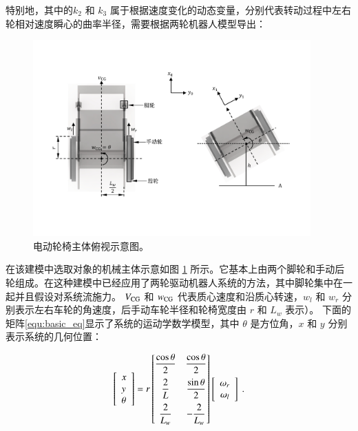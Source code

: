 特别地，其中的$ k_2 $ 和 $ k_3 $ 属于根据速度变化的动态变量，分别代表转动过程中左右轮相对速度瞬心的曲率半径，需要根据两轮机器人模型导出：

\begin{figure}[!b]
	\centering
	\includegraphics[width=0.95\textwidth]{fig/top_view.pdf}
	\caption{电动轮椅主体俯视示意图。}\label{fig:top_view}
\end{figure}

在该建模中选取对象的机械主体示意如图 \ref{fig:top_view} 所示。它基本上由两个脚轮和手动后轮组成。在这种建模中已经应用了两轮驱动机器人系统的方法，其中脚轮集中在一起并且假设对系统流施力。 
$ V_{\rm{CG}} $ 和 $ w_{\rm{CG}} $ 代表质心速度和沿质心转速，$ w_l $ 和 $ w_r $ 分别表示左右车轮的角速度，后手动车轮半径和轮椅宽度由 $ r $ 和 $ L_w $ 表示）。
下面的矩阵\ref{equ:basic_eq}显示了系统的运动学数学模型，其中 $ \theta $ 是方位角，$ x $ 和 $ y $ 分别表示系统的几何位置：

\begin{equation}
\label{equ:basic_eq}
\begin{bmatrix} \begin{array}{l}{x} \\ {y} \\ {\theta}\end{array} \end{bmatrix}
=
r
\begin{bmatrix}
\vspace{0.2cm} {\dfrac{\cos \theta}{2}} & {\dfrac{\cos \theta}{2}} \\
\vspace{0.2cm} {\dfrac{2}{L}} & {\dfrac{\sin \theta}{2}} \\
{\dfrac{2}{L_w}} & - {\dfrac{2}{L_w}}
\end{bmatrix}
\begin{bmatrix} \begin{array}{c}{\omega_r} \\ {\omega_l}\end{array} \end{bmatrix}
\ .
\end{equation}

